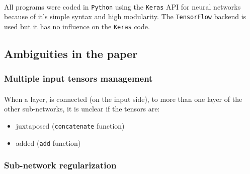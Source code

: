 \documentclass[11 pt]{article}
\begin{document}
	\paragraph{} All programs were coded in \texttt{Python} using the \texttt{Keras} API for neural networks because of it's simple syntax and high modularity. The \texttt{TensorFlow} backend is used but it has no influence on the \texttt{Keras} code.

\subsection{Ambiguities in the paper}
\subsubsection{Multiple input tensors management}
\label{subsec:mult}

\paragraph{}When a layer, is connected (on the input side), to more than one layer of the other sub-networks, it is unclear if the tensors are: \medskip
\begin{itemize}
	\item juxtaposed (\texttt{concatenate} function)
	\item added (\texttt{add} function)
\end{itemize}

\subsubsection{Sub-network regularization}
\end{document}

